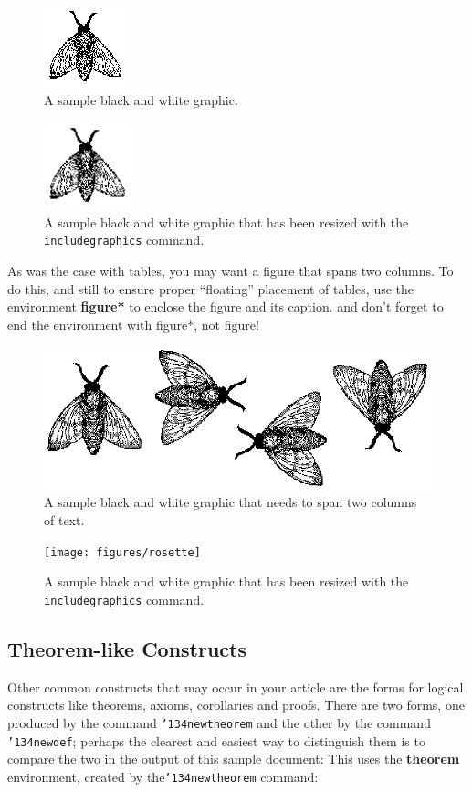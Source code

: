 \documentclass{sig-alternate-05-2015}
\begin{document}
\begin{figure}
	\centering
	\includegraphics{figures/fly}
	\caption{A sample black and white graphic.}
\end{figure}

\begin{figure}
	\centering
	\includegraphics[height=1in, width=1in]{figures/fly}
	\caption{A sample black and white graphic
	that has been resized with the \texttt{includegraphics} command.}
\end{figure}

As was the case with tables, you may want a figure that spans two columns.  To do this, and still to ensure proper ``floating'' placement of tables, use the environment \textbf{figure*} to enclose the figure and its caption. and don't forget to end the environment with {figure*}, not {figure}!

\begin{figure}
	\centering
	\includegraphics{figures/flies}
	\caption{A sample black and white graphic
	that needs to span two columns of text.}
\end{figure}

\begin{figure}
	\centering
	\texttt{[image: figures/rosette]}
	\caption{A sample black and white graphic that has
	been resized with the \texttt{includegraphics} command.}
	\vskip -6pt
\end{figure}

\subsection{Theorem-like Constructs}
Other common constructs that may occur in your article are the forms for logical constructs like theorems, axioms, corollaries and proofs.  There are two forms, one produced by the command \texttt{{\char'134}newtheorem} and the other by the command \texttt{{\char'134}newdef}; perhaps the clearest and easiest way to distinguish them is to compare the two in the output of this sample document: This uses the \textbf{theorem} environment, created by the\linebreak\texttt{{\char'134}newtheorem} command:
\end{document}
